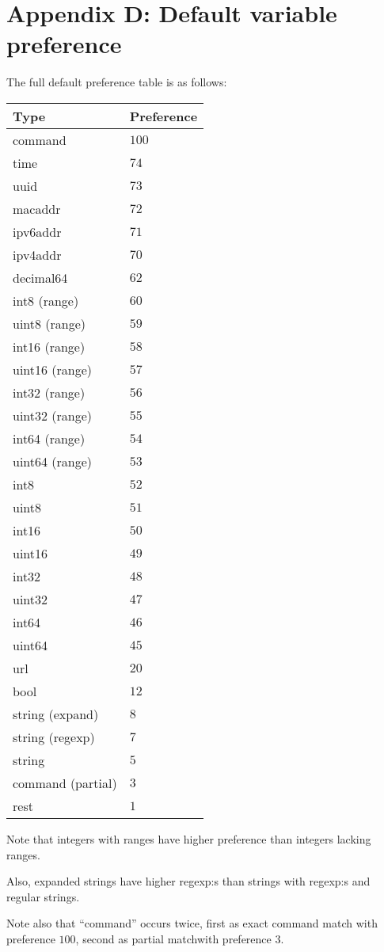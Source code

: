 \documentclass[a4paper, 10pt] {article}
\begin{document}
\newpage
\section*{Appendix D: Default variable preference}
\label{app:varpref}
The full default preference table is as follows:

\begin{tabular}{ | l | l | }
\hline
  \textbf{ Type} & \textbf{Preference} \\
\hline
command         & $100$  \\
time            & $74$   \\
uuid            & $73$   \\
macaddr         & $72$   \\
ipv6addr        & $71$   \\
ipv4addr        & $70$   \\
decimal64       & $62$   \\
int8 (range)    & $60$   \\
uint8 (range)   & $59$   \\
int16 (range)   & $58$   \\
uint16 (range)  & $57$   \\
int32 (range)   & $56$   \\
uint32 (range)  & $55$   \\
int64 (range)   & $54$   \\
uint64 (range)  & $53$   \\
int8            & $52$   \\
uint8           & $51$   \\
int16           & $50$   \\
uint16          & $49$   \\
int32           & $48$   \\
uint32          & $47$   \\
int64           & $46$   \\
uint64          & $45$   \\
url             & $20$   \\
bool            & $12$   \\
string (expand) & $8$    \\
string (regexp) & $7$    \\
string          & $5$    \\
command (partial) & $3$ \\
rest            & $1$    \\
\hline
\end{tabular}

Note that integers with ranges have higher preference than integers lacking ranges.

Also, expanded strings have higher regexp:s than strings with regexp:s and regular strings.

Note also that ``command'' occurs twice, first as exact command match with preference $100$, second as partial matchwith preference $3$.
\end{document}
